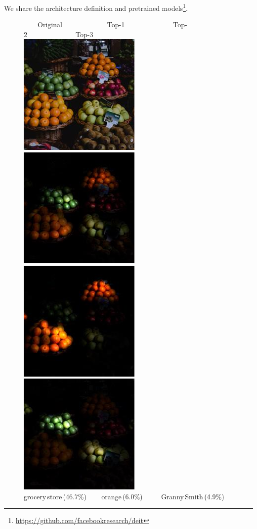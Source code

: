 \noindent We share the architecture definition and pretrained models\footnote{\url{https://github.com/facebookresearch/deit}}. 

\begin{figure}[t]

         \vspace{-0.2ex}
             ~~~~Original~~~~~~~~~~~~~Top-1~~~~~~~~~~~~~~Top-2~~~~~~~~~~~~~~Top-3\\
              \includegraphics[width=0.24\linewidth]{figs/multiclass/pexels-eva-elijas-6148830.jpg} \hfill%
              \includegraphics[width=0.24\linewidth]{figs/multiclass/attn0_multi_pexels-eva-elijas-6148830.jpg} \hfill %
              \includegraphics[width=0.24\linewidth]{figs/multiclass/attn1_multi_pexels-eva-elijas-6148830.jpg} \hfill %
              \includegraphics[width=0.24\linewidth]{figs/multiclass/attn2_multi_pexels-eva-elijas-6148830.jpg} \\[-5pt] %
               {\scriptsize \phantom{0} \hspace{0.215\linewidth} grocery\,store\,(46.7\%) ~~~ orange\,(6.0\%) ~~~~ Granny\,Smith\,(4.9\%)} \\ %

\end{figure}
